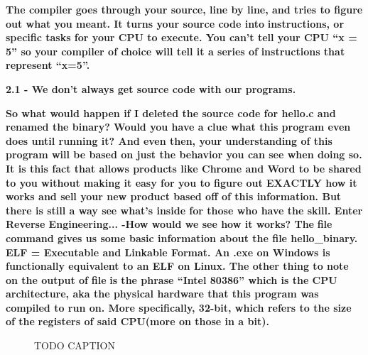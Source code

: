 \documentclass[letterpaper]{article}
\newcommand{\sitfig}[3]{
\begin{figure}[H]
\centering
\makebox[\textwidth][c]{
#2
}
\caption{#3}
\label{#1}
\end{figure}
}
\newcommand{\sitgfx}[4][scale=1.0]{
\sitfig{#3}{\texttt{[image: \#2]}}{#4}
}
\begin{document}
\textbf{The compiler goes through your source, line by line, and tries to figure out what you meant. It turns your
source code into }\textbf{\textcolor[rgb]{0.21960784,0.4627451,0.11372549}{instructions}}\textbf{, or specific tasks
for your CPU to execute. You can't tell your CPU ``x = 5'' so your compiler of choice will tell it a series of
}\textbf{\textcolor[rgb]{0.21960784,0.4627451,0.11372549}{instructions }}\textbf{that represent ``x=5''.}

{\centering
\textbf{2.1 - We don't always get source code with our programs.}
\par}

\textbf{\newline
So what would happen if I deleted the source code for hello.c and renamed the binary? Would you have a clue what this
program even does until running it? And even then, your understanding of this program will be based on just the
behavior you can see when doing so. It is this fact that allows products like Chrome and Word to be shared to you
without making it easy for you to figure out EXACTLY how it works and sell your new product based off of this
information.  But there is still a way see what's inside for those who have the skill. Enter Reverse
Engineering...\newline
\newline
{}-How would we see how it works? The }\textbf{\textcolor[rgb]{0.21960784,0.4627451,0.11372549}{file }}\textbf{command
gives us some basic information about the file hello\_binary. ELF = Executable and Linkable Format. An .exe on Windows
is functionally equivalent to an ELF on Linux. The other thing to note on the output of
}\textbf{\textcolor[rgb]{0.21960784,0.4627451,0.11372549}{file}}\textbf{ is the phrase ``Intel 80386'' which is the CPU
}\textbf{\textcolor[rgb]{0.21960784,0.4627451,0.11372549}{architecture, }}\textbf{aka the physical hardware that this
program was compiled to run on. More specifically, 32-bit, which refers to the size of the
}\textbf{\textcolor[rgb]{0.21960784,0.4627451,0.11372549}{registers }}\textbf{of said CPU(more on those in a bit).}

\textbf{ }  
\sitgfx[width=6.5in,height=0.6252in]{FINALWORKINGDOCFORMERLYPRECURSOR-img007.png}{fig:unk}{TODO CAPTION}
 
\end{document}
